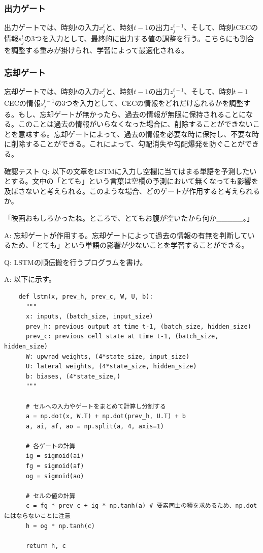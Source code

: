 \documentclass{ltjsarticle}
\begin{document}
\subsubsection{出力ゲート}
出力ゲートでは、時刻$t$の入力$x_j^t$と、時刻$t-1$の出力$z_j^{t-1}$、そして、時刻$t$CECの情報$s_j^{t}$の3つを入力として、最終的に出力する値の調整を行う。こちらにも割合を調整する重みが掛けられ、学習によって最適化される。
\subsubsection{忘却ゲート}
忘却ゲートでは、時刻$t$の入力$x_j^t$と、時刻$t-1$の出力$z_j^{t-1}$、そして、時刻$t-1$CECの情報$s_j^{t-1}$の3つを入力として、CECの情報をどれだけ忘れるかを調整する。もし、忘却ゲートが無かったら、過去の情報が無限に保持されることになる。このことは過去の情報がいらなくなった場合に、削除することができないことを意味する。忘却ゲートによって、過去の情報を必要な時に保持し、不要な時に削除することができる。これによって、勾配消失や勾配爆発を防ぐことができる。

\newpage

\begin{itembox}[l]{確認テスト}
  Q: 以下の文章をLSTMに入力し空欄に当てはまる単語を予測したいとする。文中の「とても」という言葉は空欄の予測において無くなっても影響を及ぼさないと考えられる。このような場合、どのゲートが作用すると考えられるか。
  \par
  「映画おもしろかったね。ところで、とてもお腹が空いたから何か\_\_\_\_\_。」

  A: 忘却ゲートが作用する。忘却ゲートによって過去の情報の有無を判断しているため、「とても」という単語の影響が少ないことを学習することができる。

  Q: LSTMの順伝搬を行うプログラムを書け。

  A: 以下に示す。
  \begin{verbatim}
    def lstm(x, prev_h, prev_c, W, U, b):
      """
      x: inputs, (batch_size, input_size)
      prev_h: previous output at time t-1, (batch_size, hidden_size)
      prev_c: previous cell state at time t-1, (batch_size, hidden_size)
      W: upwrad weights, (4*state_size, input_size)
      U: lateral weights, (4*state_size, hidden_size)
      b: biases, (4*state_size,)
      """

      # セルへの入力やゲートをまとめて計算し分割する
      a = np.dot(x, W.T) + np.dot(prev_h, U.T) + b
      a, ai, af, ao = np.split(a, 4, axis=1)

      # 各ゲートの計算
      ig = sigmoid(ai)
      fg = sigmoid(af)
      og = sigmoid(ao)

      # セルの値の計算
      c = fg * prev_c + ig * np.tanh(a) # 要素同士の積を求めるため、np.dotにはならないことに注意
      h = og * np.tanh(c)

      return h, c
  \end{verbatim}
\end{itembox}
\end{document}
